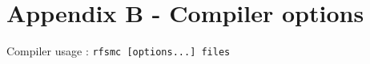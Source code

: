 \chapter*{Appendix B - Compiler options}
\label{cha:compiler-options}

Compiler usage : \verb|rfsmc [options...] files|

\medskip
\begin{tabular}[c]{ll}

\end{tabular}

\normalsize

